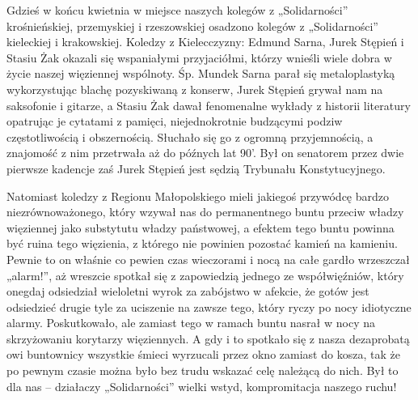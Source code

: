 Gdzieś w końcu kwietnia w miejsce naszych kolegów z „Solidarności” krośnieńskiej, przemyskiej i rzeszowskiej osadzono kolegów z „Solidarności” kieleckiej i krakowskiej. Koledzy z Kielecczyzny: Edmund Sarna, Jurek Stępień i Stasiu Żak okazali się wspaniałymi przyjaciółmi, którzy wnieśli wiele dobra w życie naszej więziennej wspólnoty. Śp. Mundek Sarna parał się metaloplastyką wykorzystując blachę pozyskiwaną z konserw, Jurek Stępień grywał nam na saksofonie i gitarze, a Stasiu Żak dawał fenomenalne wykłady z historii literatury opatrując je cytatami z pamięci, niejednokrotnie budzącymi podziw częstotliwością i obszernością. Słuchało się go z ogromną przyjemnością, a znajomość z nim przetrwała aż do późnych lat 90’. Był on senatorem przez dwie pierwsze kadencje zaś Jurek Stępień jest sędzią Trybunału Konstytucyjnego.

Natomiast koledzy z Regionu Małopolskiego mieli jakiegoś przywódcę bardzo niezrównoważonego, który wzywał nas do permanentnego buntu przeciw władzy więziennej jako substytutu władzy państwowej, a efektem tego buntu powinna być ruina tego więzienia, z którego nie powinien pozostać kamień na kamieniu. Pewnie to on właśnie co pewien czas wieczorami i nocą na całe gardło wrzeszczał „alarm!”, aż wreszcie spotkał się z zapowiedzią jednego ze współwięźniów, który onegdaj odsiedział wieloletni wyrok za zabójstwo w afekcie, że gotów jest odsiedzieć drugie tyle za uciszenie na zawsze tego, który ryczy po nocy idiotyczne alarmy. Poskutkowało, ale zamiast tego w ramach buntu nasrał w nocy na skrzyżowaniu korytarzy więziennych. A gdy i to spotkało się z nasza dezaprobatą owi buntownicy wszystkie śmieci wyrzucali przez okno zamiast do kosza, tak że po pewnym czasie można było bez trudu wskazać celę należącą do nich. Był to dla nas – działaczy „Solidarności” wielki wstyd, kompromitacja naszego ruchu!


